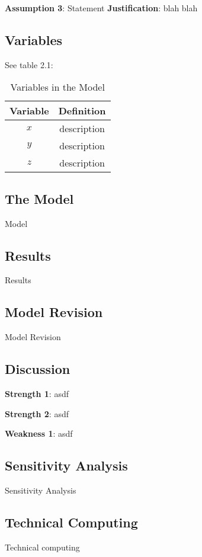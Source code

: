\documentclass{mcm}
\numberwithin{figure}{section}
\numberwithin{table}{section}
\numberwithin{equation}{section}
\begin{document}
    \noindent\textbf{Assumption 3}: Statement
    \textbf{Justification}: blah blah

    \subsection{Variables}
    See table 2.1:
    \begin{table}[h!]
        \centering
        \begin{tabular}{cc}
            \toprule
            Variable & Definition      \\
            \midrule
            $x$      & description     \\
            $y$      & description     \\
            $z$      & description     \\
            \bottomrule
        \end{tabular}
        \caption{Variables in the Model}
        \label{tab:my_label}
    \end{table}

    \subsection{The Model}
    Model

    \subsection{Results}
    Results

    \subsection{Model Revision}
    Model Revision

    \subsection{Discussion}
    
    \noindent\textbf{Strength 1}: asdf

    \noindent\textbf{Strength 2}: asdf

    \noindent\textbf{Weakness 1}: asdf

    \subsection{Sensitivity Analysis}
    Sensitivity Analysis

    \subsection{Technical Computing}
    Technical computing
\end{document}

